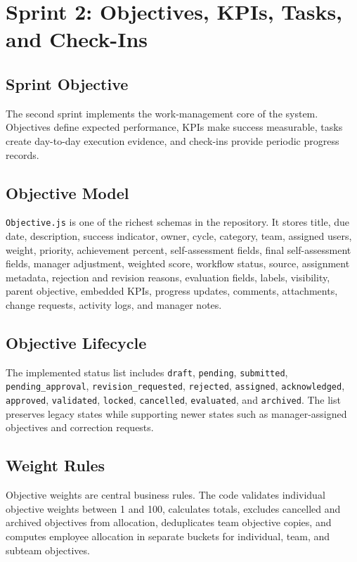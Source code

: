 \chapter{Sprint 2: Objectives, KPIs, Tasks, and Check-Ins}
\section{Sprint Objective}
The second sprint implements the work-management core of the system. Objectives define expected performance, KPIs make success measurable, tasks create day-to-day execution evidence, and check-ins provide periodic progress records.

\section{Objective Model}
\texttt{Objective.js} is one of the richest schemas in the repository. It stores title, due date, description, success indicator, owner, cycle, category, team, assigned users, weight, priority, achievement percent, self-assessment fields, final self-assessment fields, manager adjustment, weighted score, workflow status, source, assignment metadata, rejection and revision reasons, evaluation fields, labels, visibility, parent objective, embedded KPIs, progress updates, comments, attachments, change requests, activity logs, and manager notes.

\section{Objective Lifecycle}
The implemented status list includes \texttt{draft}, \texttt{pending}, \texttt{submitted}, \texttt{pending\_approval}, \texttt{revision\_requested}, \texttt{rejected}, \texttt{assigned}, \texttt{acknowledged}, \texttt{approved}, \texttt{validated}, \texttt{locked}, \texttt{cancelled}, \texttt{evaluated}, and \texttt{archived}. The list preserves legacy states while supporting newer states such as manager-assigned objectives and correction requests.




\section{Weight Rules}
Objective weights are central business rules. The code validates individual objective weights between 1 and 100, calculates totals, excludes cancelled and archived objectives from allocation, deduplicates team objective copies, and computes employee allocation in separate buckets for individual, team, and subteam objectives.


